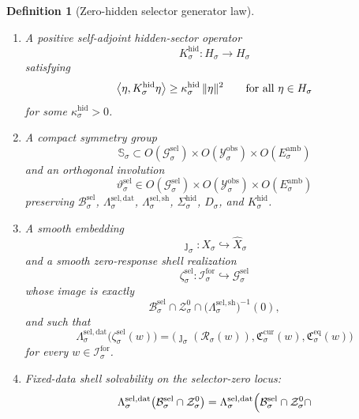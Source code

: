 \documentclass[11pt]{article}
\newcommand{\ForSpace}[1]{\mathcal I_{#1}^{\mathrm{for}}}
\newcommand{\Reduction}[1]{\mathcal R_{#1}}
\newcommand{\CurrentCarrier}[1]{\mathfrak C_{#1}^{\mathrm{cur}}}
\newcommand{\EqCarrier}[1]{\mathfrak C_{#1}^{\mathrm{eq}}}
\newcommand{\VisibleAffine}[1]{\widehat X_{#1}}
\newcommand{\DataSpace}[1]{\mathcal Y_{#1}^{\mathrm{obs}}}
\newcommand{\AmbientTarget}[1]{E_{#1}^{\mathrm{amb}}}
\newcommand{\GapSpace}[1]{H_{#1}}
\newcommand{\GapBody}[1]{D_{#1}}
\newcommand{\HiddenOperator}[1]{K_{#1}^{\mathrm{hid}}}
\newcommand{\GenSpace}[1]{\mathcal G_{#1}^{\mathrm{sel}}}
\newcommand{\GenBody}[1]{\mathcal B_{#1}^{\mathrm{sel}}}
\newcommand{\GenData}[1]{\Lambda_{#1}^{\mathrm{sel,dat}}}
\newcommand{\GenShell}[1]{\Lambda_{#1}^{\mathrm{sel,sh}}}
\newcommand{\HiddenSel}[1]{\Sigma_{#1}^{\mathrm{hid}}}
\newcommand{\ZeroHiddenSlice}[1]{\mathcal Z_{#1}^{0}}
\newcommand{\GenSym}[1]{\mathbb S_{#1}}
\newcommand{\GenTime}[1]{\vartheta_{#1}^{\mathrm{sel}}}
\newcommand{\GenEmbed}[1]{\zeta_{#1}^{\mathrm{sel}}}
\newtheorem{definition}{Definition}
\begin{document}
\begin{definition}[Zero-hidden selector generator law]
\begin{enumerate}
\[    \]
    such that the selector-state body splits exactly as
    \begin{equation}
    \GenBody{\sigma}
    =
    \left\{
    z+\eta:
    z\in\GenBody{\sigma}\cap\ZeroHiddenSlice{\sigma},
    \quad
    \eta\in\GapBody{\sigma}
    \right\}.
    \label{eq:gensplitting}
    \end{equation}
    \item A positive self-adjoint hidden-sector operator
    \[
    \HiddenOperator{\sigma}:\GapSpace{\sigma}\to\GapSpace{\sigma}
    \]
    satisfying
    \begin{equation}
    \ev{\eta,\HiddenOperator{\sigma}\eta}
    \ge
    \kappa_{\sigma}^{\mathrm{hid}}\,
    \|\eta\|^{2}
    \qquad
    \text{for all }\eta\in\GapSpace{\sigma}
    \label{eq:gengap}
    \end{equation}
    for some \(\kappa_{\sigma}^{\mathrm{hid}}>0\).
    \item A compact symmetry group
    \[
    \GenSym{\sigma}\subset
    O(\GenSpace{\sigma})\times
    O(\DataSpace{\sigma})\times
    O(\AmbientTarget{\sigma})
    \]
    and an orthogonal involution
    \[
    \GenTime{\sigma}\in
    O(\GenSpace{\sigma})\times
    O(\DataSpace{\sigma})\times
    O(\AmbientTarget{\sigma})
    \]
    preserving \(\GenBody{\sigma}\), \(\GenData{\sigma}\), \(\GenShell{\sigma}\), \(\HiddenSel{\sigma}\), \(\GapBody{\sigma}\), and \(\HiddenOperator{\sigma}\).
    \item A smooth embedding
    \[
    \jmath_{\sigma}:X_{\sigma}\hookrightarrow\VisibleAffine{\sigma}
    \]
    and a smooth zero-response shell realization
    \[
    \GenEmbed{\sigma}:\ForSpace{\sigma}\hookrightarrow\GenSpace{\sigma}
    \]
    whose image is exactly
    \[
    \GenBody{\sigma}\cap
    \ZeroHiddenSlice{\sigma}\cap
    \bigl(\GenShell{\sigma}\bigr)^{-1}(0),
    \]
    and such that
    \begin{equation}
    \GenData{\sigma}\bigl(\GenEmbed{\sigma}(w)\bigr)
    =
    \bigl(
    \jmath_{\sigma}(\Reduction{\sigma}(w)),
    \CurrentCarrier{\sigma}(w),
    \EqCarrier{\sigma}(w)
    \bigr)
    \label{eq:gencompat}
    \end{equation}
    for every \(w\in\ForSpace{\sigma}\).
    \item Fixed-data shell solvability on the selector-zero locus:
    \begin{equation}
    \GenData{\sigma}\bigl(
    \GenBody{\sigma}\cap\ZeroHiddenSlice{\sigma}
    \bigr)
    =
    \GenData{\sigma}\Bigl(
    \GenBody{\sigma}\cap
    \ZeroHiddenSlice{\sigma}\cap

\end{equation}
\end{enumerate}
\end{definition}
\end{document}

